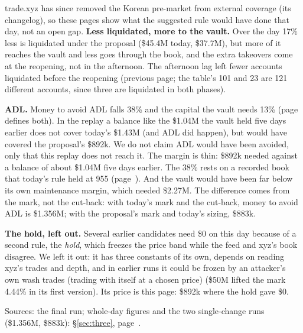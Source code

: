 trade.xyz has since removed the Korean pre-market from external coverage (its changelog), so these pages show what the suggested rule would have done that day, not an open gap. \textbf{Less liquidated, more to the vault.} Over the day 17\% less is liquidated under the proposal (\$45.4M today, \$37.7M), but more of it reaches the vault and less goes through the book, and the extra takeovers come at the reopening, not in the afternoon. The afternoon lag left fewer accounts liquidated before the reopening (previous page; the table's 101 and 23 are 121 different accounts, since three are liquidated in both phases).

\textbf{ADL.} Money to avoid ADL falls 38\% and the capital the vault needs 13\% (page~\pageref{sec:res-mark} defines both). In the replay a balance like the \$1.04M the vault held five days earlier does not cover today's \$1.43M (and ADL did happen), but would have covered the proposal's \$892k. We do not claim ADL would have been avoided, only that this replay does not reach it. The margin is thin: \$892k needed against a balance of about \$1.04M five days earlier. The 38\% rests on a recorded book that today's rule held at 955 (page~\pageref{sec:skhx}). And the vault would have been far below its own maintenance margin, which needed \$2.27M. The difference comes from the mark, not the cut-back: with today's mark and the cut-back, money to avoid ADL is \$1.356M; with the proposal's mark and today's sizing, \$883k.

\textbf{The hold, left out.} Several earlier candidates need \$0 on this day because of a second rule, the \emph{hold}, which freezes the price band while the feed and xyz's book disagree. We left it out: it has three constants of its own, depends on reading xyz's trades and depth, and in earlier runs it could be frozen by an attacker's own wash trades (trading with itself at a chosen price) (\$50M lifted the mark 4.44\% in its first version). Its price is this page: \$892k where the hold gave \$0.

\par{\small\color{mute}Sources: the final run; whole-day figures and the two single-change runs (\$1.356M, \$883k): \S\ref{sec:three}, page~\pageref{sec:three}.\par}

\label{sec:res-cut}

